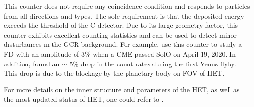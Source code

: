 This counter does not require any coincidence condition and responds to particles from all directions and types. The sole requirement is that the deposited energy exceeds the threshold of the C detector. Due to its large geometry factor, this counter exhibits excellent counting statistics and can be used to detect minor disturbances in the \ac{GCR} background. For example, \citet{Forstner-2021-SolO} use this counter to study a \ac{FD} with an amplitude of 3\% when a \ac{CME} passed \ac{SolO} on April 19, 2020. In addition, \citet{Allen2021AA_venus} found an $\sim$ 5\% drop in the count rates during the first Venus flyby. This drop is due to the blockage by the planetary body on \ac{FOV} of \ac{HET}.



For more details on the inner structure and parameters of the \ac{HET}, as well as the most updated status of \ac{HET}, one could refer to \citet{Elftmann-2020-PhD, RodriguezPacheco-2019-EPD, Wimmer2021AA}.

